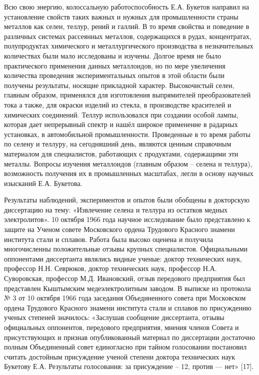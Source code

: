 \begin{multicols}{2}
Всю свою энергию, колоссальную работоспособность Е.А. Букетов направил
на установление свойств таких важных и нужных для промышленности страны
металлов как селен, теллур, рений и галлий. В то время свойства и
поведение в различных системах рассеянных металлов, содержащихся в
рудах, концентратах, полупродуктах химического и металлургического
производства в незначительных количествах были мало исследованы и
изучены. Долгое время не было практического применения данных
металлоидов, но по мере увеличения количества проведения
экспериментальных опытов в этой области были получены результаты,
носящие прикладной характер. Высокочистый селен, главным образом,
применялся для изготовления выпрямителей преобразователей тока а также,
для окраски изделий из стекла, в производстве красителей и химических
соединений. Теллур использовался при создании особой лампы, которая дает
непрерывный спектр и нашёл широкое применение в радарных установках, в
автомобильной промышленности. Проведенные в то время работы по селену и
теллуру, на сегодняшний день, являются ценным справочным материалом для
специалистов, работающих с продуктами, содержащими эти металлы. Вопросы
изучения металлоидов (главным образом -- селена и теллура), возможность
получения их в промышленных масштабах, легли в основу научных изысканий
Е.А. Букетова.

Результаты наблюдений, экспериментов и опытов были обобщены в докторскую
диссертацию на тему: «Извлечение селена и теллура из остатков медных
электролитов». 10 октября 1966 года научное исследование было
представлено к защите на Ученом совете Московского ордена Трудового
Красного знамени института стали и сплавов. Работа была высоко оценена и
получила многочисленны положительные отзывы крупных специалистов.
Официальными оппонентами диссертанта являлись видные ученые: доктор
технических наук, профессор Н.Н. Севрюков, доктор технических наук,
профессор Н.А. Суворовская, профессор М.Д. Ивановский, отзыв передового
предприятия был представлен Кыштымским медеэлектролитным заводом. В
выписке из протокола № 3 от 10 октября 1966 года заседания Объединенного
совета при Московском ордена Трудового Красного знамени института стали
и сплавов по присуждению ученых степеней значилось: «Заслушав сообщение
диссертанта, отзывы официальных оппонентов, передового предприятия,
мнения членов Совета и присутствующих и признав опубликованный материал
по диссертации достаточно полным Объединенный совет единогласно при
тайном голосовании постановил считать достойным присуждение ученой
степени доктора технических наук Букетову Е.А. Результаты голосования:
за присуждение -- 12, против --- нет» {[}17{]}.


\end{multicols}
